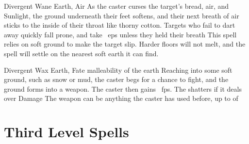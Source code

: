 \begin{multicols}{2}
  {Divergent}%
  {Wane}%
  {Earth, Air}%
  {}%
  {As the caster curses the target's bread, air, and Sunlight, the ground underneath their feet softens, and their next breath of air sticks to the inside of their throat like thorny cotton.
  Targets who fail to dart away quickly fall prone, and take ~\glspl{ep} unless they held their breath}%
  {
  This spell relies on soft ground to make the target slip.
  Harder floors will not melt, and the spell will settle on the nearest soft earth it can find.}

  {Divergent}%
  {Wax}%
  {Earth, Fate}%
  {malleability of the earth}%
  {Reaching into some soft ground, such as snow or mud, the caster begs for a chance to fight, and the ground forms into a weapon.
  The caster then gains ~\glspl{fp}.
  The shatters if it deals over  Damage}%
  {
  The weapon can be anything the caster has used before, up to  of }

\end{multicols}

\section{Third Level Spells}

